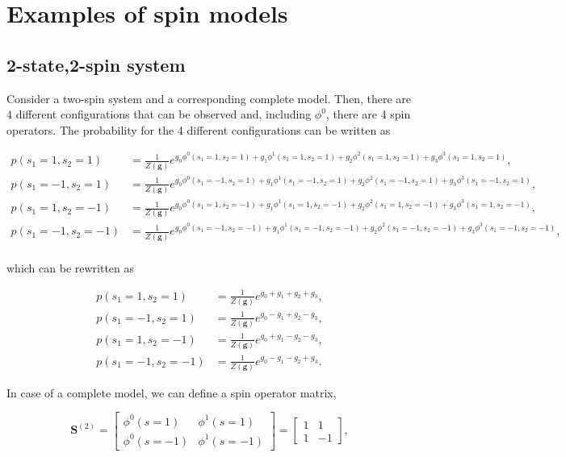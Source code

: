 \newpage

\section{Examples of spin models}

\subsection{2-state,2-spin system}\label{sec:2spin_2states}

Consider a two-spin system and a corresponding complete model. Then, there are 4 different configurations that can be observed and, including $\phi^0$, there are 4 spin operators.
The probability for the 4 different configurations can be written as

\begin{align*}
    p(s_1=1, s_2=1) &= \frac{1}{Z(\mathbf{g})} e^{g_0 \phi^0(s_1=1, s_2=1) + g_1 \phi^1(s_1=1, s_2=1) + g_2 \phi^2(s_1=1, s_2=1) + g_3 \phi^3(s_1=1, s_2=1)},\\
    p(s_1=-1, s_2=1) &= \frac{1}{Z(\mathbf{g})} e^{g_0 \phi^0(s_1=-1, s_2=1) + g_1 \phi^1(s_1=-1, s_2=1) + g_2 \phi^2(s_1=-1, s_2=1) + g_3 \phi^3(s_1=-1, s_2=1)},\\
    p(s_1=1, s_2=-1) &= \frac{1}{Z(\mathbf{g})} e^{g_0 \phi^0(s_1=1, s_2=-1) + g_1 \phi^1(s_1=1, s_2=-1) + g_2 \phi^2(s_1=1, s_2=-1) + g_3 \phi^3(s_1=1, s_2=-1)},\\
    p(s_1=-1, s_2=-1) &= \frac{1}{Z(\mathbf{g})} e^{g_0 \phi^0(s_1=-1, s_2=-1) + g_1 \phi^1(s_1=-1, s_2=-1) + g_2 \phi^2(s_1=-1, s_2=-1) + g_3 \phi^3(s_1=-1, s_2=-1)},\\
\end{align*}

\noindent
which can be rewritten as

\begin{align*}
    p(s_1=1, s_2=1) &= \frac{1}{Z(\mathbf{g})} e^{g_0 + g_1 + g_2 + g_3},\\
    p(s_1=-1, s_2=1) &= \frac{1}{Z(\mathbf{g})} e^{g_0 - g_1 + g_2 - g_3},\\
    p(s_1=1, s_2=-1) &= \frac{1}{Z(\mathbf{g})} e^{g_0 + g_1 - g_2 - g_3},\\
    p(s_1=-1, s_2=-1) &= \frac{1}{Z(\mathbf{g})} e^{g_0 - g_1 - g_2 + g_3}.
\end{align*}

\noindent
In case of a complete model, we can define a spin operator matrix,

\begin{equation}
    \mathbf{S}^{(2)} = \begin{bmatrix}
        \phi^0(s=1) & \phi^1(s=1)\\
        \phi^0(s=-1) & \phi^1(s=-1)
    \end{bmatrix} = \begin{bmatrix}
        1 & 1\\
        1 & -1
    \end{bmatrix},
\end{equation}

